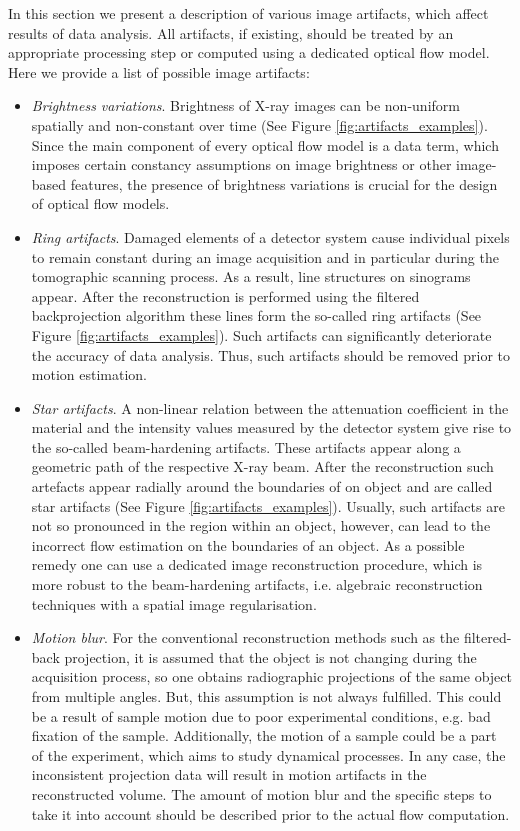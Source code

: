 In this section we present a description of various image artifacts, which affect results of data analysis. All artifacts, if existing, should be treated by an appropriate processing step or computed using a dedicated optical flow model. 
Here we provide a list of possible image artifacts:
\begin{itemize}
	\item \textit{Brightness variations}. Brightness of X-ray images can be non-uniform spatially and non-constant over time (See Figure \ref{fig:artifacts_examples}). Since the main component of every optical flow model is a data term, which imposes certain constancy assumptions on image brightness or other image-based features, the presence of brightness variations is crucial for the design of optical flow models.  
	
	\item \textit{Ring artifacts}. Damaged elements of a detector system cause individual pixels to remain constant during an image acquisition and in particular during the tomographic scanning process. As a result, line structures on sinograms appear. After the reconstruction is performed using the filtered backprojection algorithm these lines form the so-called ring artifacts (See Figure \ref{fig:artifacts_examples}). Such artifacts can significantly deteriorate the accuracy of data analysis. Thus, such artifacts should be removed prior to motion estimation.
	
	\item \textit{Star artifacts}. A non-linear relation between the attenuation coefficient in the material and the intensity values measured by the detector system give rise to the so-called beam-hardening artifacts. These artifacts appear along a geometric path of the respective X-ray beam. After the reconstruction such artefacts appear radially around the boundaries of on object and are called star artifacts (See Figure \ref{fig:artifacts_examples}). Usually, such artifacts are not so pronounced in the region within an object, however, can lead to the incorrect flow estimation on the boundaries of an object. As a possible remedy one can use a dedicated image reconstruction procedure, which is more robust to the beam-hardening artifacts, i.e. algebraic reconstruction techniques with a spatial image regularisation. 
	
	\item \textit{Motion blur}. For the conventional reconstruction methods such as the filtered-back projection, it is assumed that the object is not changing during the acquisition process, so one obtains radiographic projections of the same object from multiple angles. But, this assumption is not always fulfilled. This could be a result of sample motion due to poor experimental conditions, e.g. bad fixation of the sample. Additionally, the motion of a sample could be a part of the experiment, which aims to study dynamical processes. In any case, the inconsistent projection data will result in motion artifacts in the reconstructed volume. The amount of motion blur and the specific steps to take it into account should be described prior to the actual flow computation. 
	

\end{itemize}
